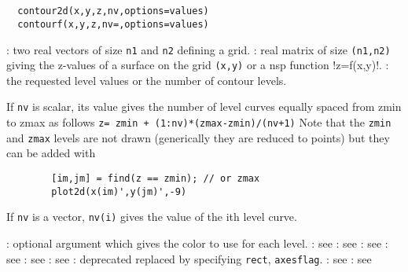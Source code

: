 \begin{mandesc}
  \\
  \\
\end{mandesc}
\begin{calling_sequence}
\begin{verbatim}
  contour2d(x,y,z,nv,options=values)
  contourf(x,y,z,nv=,options=values)
\end{verbatim}
\end{calling_sequence}

\begin{parameters}
  \begin{varlist}
    : two real vectors of size \verb!n1! and \verb!n2! defining a grid.
    : real matrix of size \verb!(n1,n2)! giving the z-values of a surface on the grid
    \verb!(x,y)! or a nsp function !z=f(x,y)!.
    : the requested level values or the number of contour levels.
    \begin{varlist}
      \vname{-}If \verb!nv! is scalar, its value gives the
      number of level curves equally spaced from zmin to zmax as
      follows \verb!z= zmin + (1:nv)*(zmax-zmin)/(nv+1)!
      Note that the \verb!zmin! and \verb!zmax!
      levels are not drawn (generically they are reduced to points)
      but they can be added with
      \begin{Verbatim}
        [im,jm] = find(z == zmin); // or zmax
        plot2d(x(im)',y(jm)',-9)
      \end{Verbatim}
      \vname{-}If \verb!nv! is a vector, \verb!nv(i)! gives
      the value of the ith level curve.
    \end{varlist}
    : optional argument which gives the color to use for each level.
    : see 
    : see 
    : see 
    : see 
    : see 
    : see 
    : deprecated replaced by specifying \verb!rect!, \verb!axesflag!.
    : see 
    : see 
  \end{varlist}
\end{parameters}

